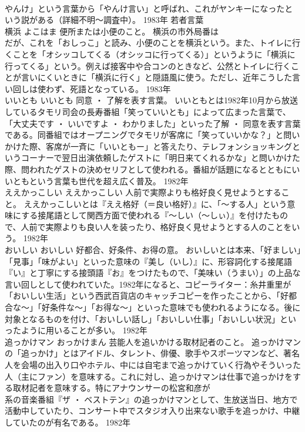 \documentclass[8pt]{extreport}
\begin{document}
\begin{CJK}{UTF8}{min}
\\	やんけ」という言葉から「やんけ言い」と呼ばれ、これがヤンキーになったという説がある（詳細不明～調査中）。	1983年	若者言葉	
\\	横浜	よこはま	便所または小便のこと。	横浜の市外局番は
\\	だが、これを「おしっこ」と読み、小便のことを横浜という。また、トイレに行くことを「オシッコしてくる（オシッコに行ってくる）」というように「横浜に行ってくる」という。例えば接客中や合コンのときなど、公然とトイレに行くことが言いにくいときに「横浜に行く」と隠語風に使う。ただし、近年こうした言い回しは使わず、死語となっている。	1983年	
\\	いいとも	いいとも	同意 ・ 了解を表す言葉。	いいともとは1982年10月から放送しているタモリ司会の長寿番組「笑っていいとも」によって広まった言葉で、「大丈夫です ・ いいですよ ・ わかりました」といった了解 ・ 同意を表す言葉である。同番組ではオープニングでタモリが客席に「笑っていいかな？」と問いかけた際、客席が一斉に「いいともー」と答えたり、テレフォンショッキングというコーナーで翌日出演依頼したゲストに「明日来てくれるかな」と問いかけた際、問われたゲストの決めセリフとして使われる。番組が話題になるとともにいいともという言葉も世代を超え広く普及。	1982年	
\\	ええかっこしい	ええかっこしい	人前で実際よりも格好良く見せようとすること。	ええかっこしいとは『ええ格好（＝良い格好）』に、「～する人」という意味にする接尾語として関西方面で使われる『～しい（～しぃ）』を付けたもので、人前で実際よりも良い人を装ったり、格好良く見せようとする人のことをいう。	1982年	
\\	おいしい	おいしい	好都合、好条件、お得の意。	おいしいとは本来、「好ましい」「見事」「味がよい」といった意味の『美し（いし）』に、形容詞化する接尾語『い』と丁寧にする接頭語『お』をつけたもので、「美味い（うまい）」の上品な言い回しとして使われていた。1982年になると、コピーライター：糸井重里が「おいしい生活」という西武百貨店のキャッチコピーを作ったことから、「好都合な～」「好条件な～」「お得な～」といった意味でも使われるようになる。後に対象となるものを付け、「おいしい話し」「おいしい仕事」「おいしい状況」といったように用いることが多い。	1982年	
\\	追っかけマン	おっかけまん	芸能人を追いかける取材記者のこと。	追っかけマンの「追っかけ」とはアイドル、タレント、俳優、歌手やスポーツマンなど、著名人を会場の出入り口やホテル、中には自宅まで追っかけていく行為やそういった人（主にファン）を意味する。これに対し、追っかけマンは仕事で追っかけをする取材記者を意味する。特にアナウンサーの松宮和彦が
\\	系の音楽番組『ザ ・ ベストテン』の追っかけマンとして、生放送当日、地方で活動中していたり、コンサート中でスタジオ入り出来ない歌手を追っかけ、中継していたのが有名である。	1982年	

\end{CJK}
\end{document}
